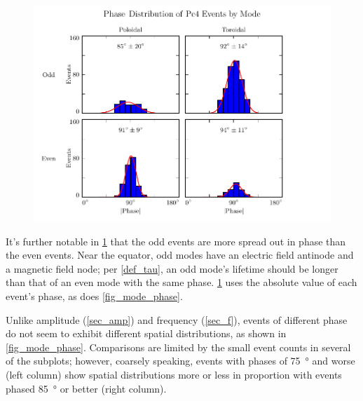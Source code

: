 \begin{figure}[!htb]
    \centering
    \includegraphics[width=\textwidth]{figures/phase.pdf}
    \caption[Phase Distribution of Pc4 Events by Mode]{
      \todo{$\cdots$}
    }
    \label{fig_phase}
\end{figure}

It's further notable in \cref{fig_phase} that the odd events are more spread out in phase than the even events. Near the equator, odd modes have an electric field antinode and a magnetic field node; per \cref{def_tau}, an odd mode's lifetime should be longer than that of an even mode with the same phase. \cref{fig_phase} uses the absolute value of each event's phase, as does \cref{fig_mode_phase}. 

Unlike amplitude (\cref{sec_amp}) and frequency (\cref{sec_f}), events of different phase do not seem to exhibit different spatial distributions, as shown in \cref{fig_mode_phase}. Comparisons are limited by the small event counts in several of the subplots; however, coarsely speaking, events with phases of \SI{75}{\degree} and worse (left column) show spatial distributions more or less in proportion with events phased \SI{85}{\degree} or better (right column). 

